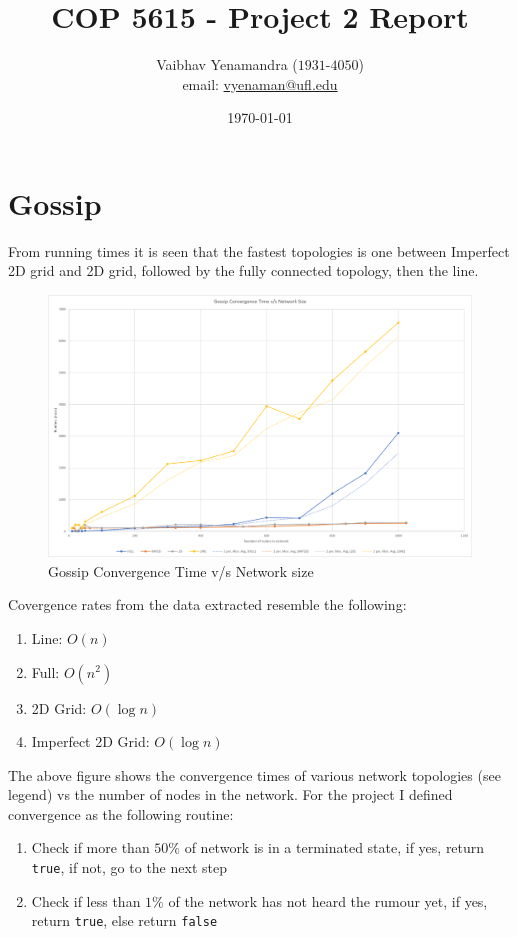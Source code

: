 \documentclass[a4paper, 10pt]{article}
\title{COP 5615 - Project 2 Report}
\author{Vaibhav Yenamandra ($1931$-$4050$)\\ email: \href{vyenaman@ufl.edu}{vyenaman@ufl.edu} }
\date{\today}
\begin{document}
    \maketitle

    \section{Gossip}
    From running times it is seen that the fastest topologies is one between Imperfect 2D grid and 2D grid, followed by the fully connected topology, then the line.
    \begin{figure}[h]
      \caption{Gossip Convergence Time v/s Network size}
      \includegraphics[width=\textwidth]{project2_gossip_chart}
    \end{figure}

    Covergence rates from the data extracted resemble the following:
    \begin{enumerate}
      \item{Line: $O(n)$}
      \item{Full: $O(n^2)$}
      \item{2D Grid: $O(\log n)$}
      \item{Imperfect 2D Grid: $O(\log n)$}
    \end{enumerate}

    The above figure shows the convergence times of various network topologies (see legend) vs the number of nodes in the network. For the project I defined convergence as the following routine:
    \begin{enumerate}
      \item{Check if more than $50\%$ of network is in a terminated state, if yes, return \texttt{true}, if not, go to the next step}
      \item{Check if less than $1\%$ of the network has not heard the rumour yet, if yes, return \texttt{true}, else return \texttt{false}}
    \end{enumerate}
\end{document}
